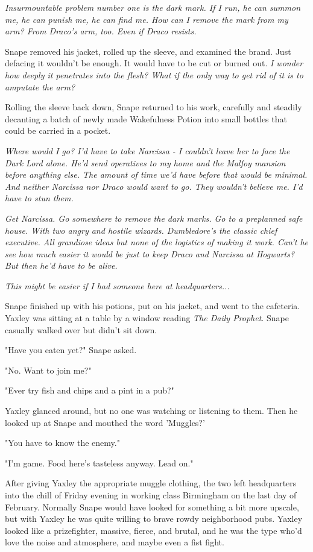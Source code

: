 \documentclass[a4paper,11pt]{article}
\begin{document}
\emph{Insurmountable problem number one is the dark mark. If I run, he can summon me, he can punish me, he can find me. How can I remove the mark from my arm? From Draco's arm, too. Even if Draco resists.}

Snape removed his jacket, rolled up the sleeve, and examined the brand. Just defacing it wouldn't be enough. It would have to be cut or burned out. \emph{I wonder how deeply it penetrates into the flesh? What if the only way to get rid of it is to amputate the arm?}

Rolling the sleeve back down, Snape returned to his work, carefully and steadily decanting a batch of newly made Wakefulness Potion into small bottles that could be carried in a pocket.

\emph{Where would I go? I'd have to take Narcissa - I couldn't leave her to face the Dark Lord alone. He'd send operatives to my home and the Malfoy mansion before anything else. The amount of time we'd have before that would be minimal. And neither Narcissa nor Draco would want to go. They wouldn't believe me. I'd have to stun them.}

\emph{Get Narcissa. Go somewhere to remove the dark marks. Go to a preplanned safe house. With two angry and hostile wizards. Dumbledore's the classic chief executive. All grandiose ideas but none of the logistics of making it work. Can't he see how much easier it would be just to keep Draco and Narcissa at Hogwarts? But then he'd have to be alive.}

\emph{This might be easier if I had someone here at headquarters...}

Snape finished up with his potions, put on his jacket, and went to the cafeteria. Yaxley was sitting at a table by a window reading \emph{The Daily Prophet}. Snape casually walked over but didn't sit down.

"Have you eaten yet?" Snape asked.

"No. Want to join me?"

"Ever try fish and chips and a pint in a pub?"

Yaxley glanced around, but no one was watching or listening to them. Then he looked up at Snape and mouthed the word 'Muggles?'

"You have to know the enemy."

"I'm game. Food here's tasteless anyway. Lead on."

After giving Yaxley the appropriate muggle clothing, the two left headquarters into the chill of Friday evening in working class Birmingham on the last day of February. Normally Snape would have looked for something a bit more upscale, but with Yaxley he was quite willing to brave rowdy neighborhood pubs. Yaxley looked like a prizefighter, massive, fierce, and brutal, and he was the type who'd love the noise and atmosphere, and maybe even a fist fight.
\end{document}
